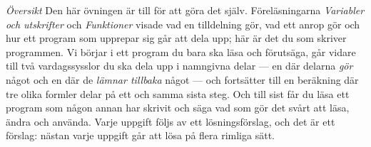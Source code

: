 
\emph{Översikt}
Den här övningen är till för att göra det själv.  Föreläsningarna
\emph{Variabler och utskrifter} och \emph{Funktioner} visade vad en
tilldelning gör, vad ett anrop gör och hur ett program som upprepar sig
går att dela upp; här är det du som skriver programmen.  Vi börjar i ett
program du bara ska läsa och förutsäga, går vidare till två
vardagssysslor du ska dela upp i namngivna delar --- en där delarna
\emph{gör} något och en där de \emph{lämnar tillbaka} något --- och
fortsätter till en beräkning där tre olika formler delar på ett och samma
sista steg.  Och till sist får du läsa ett program som någon annan har
skrivit och säga vad som gör det svårt att läsa, ändra och använda.
Varje uppgift följs av ett lösningsförslag, och det är ett förslag:
nästan varje uppgift går att lösa på flera rimliga sätt.

